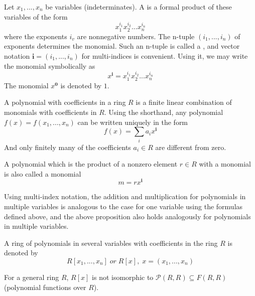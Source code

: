 \documentclass[12pt, a4paper, oneside, openright, titlepage]{book}
\begin{document}
\begin{defn}
    Let $x_1,...,x_n$ be variables (indeterminates). A  is a formal product of these variables of the form \begin{equation}
            x_1^{i_1}x_2^{i_2}...x_n^{i_n}
    \end{equation}
    where the exponents $i_v$ are nonnegative numbers. The n-tuple $(i_1,...,i_n)$ of exponents determines the monomial. Such an n-tuple is called a , and vector notation $\mathbf{i} = (i_1,...,i_n)$ for multi-indices is convenient. Using it, we may write the monomial symbolically as \begin{equation}
            x^{\mathbf{i}}=x_1^{i_1}x_2^{i_2}...x_n^{i_n}
    \end{equation}
    The monomial $x^{\mathbf{0}}$ is denoted by $1$.


    A polynomial with coefficients in a ring $R$ is a finite linear combination of monomials with coefficients in $R$. Using the shorthand, any polynomial $f(x) = f(x_1,...,x_n)$ can be written uniquely in the form \begin{equation}
            f(x) = \sum\limits_{i} a_{i}x^{\mathbf{i}}
    \end{equation}
    And only finitely many of the coefficients $a_i \in R$ are different from zero.


    A polynomial which is the product of a nonzero element $r \in R$ with a monomial is also called a monomial \begin{equation}
            m=rx^{\mathbf{i}}
    \end{equation}


    Using multi-index notation, the addition and multiplication for polynomials in multiple variables is analogous to the case for one variable using the formulas defined above, and the above proposition also holds analogously for polynomials in multiple variables. 

    A ring of polynomials in several variables with coefficients in the ring $R$ is denoted by \begin{equation}
         R[x_1,...,x_n]\;or\;R[x],\;x=(x_1,...,x_n)
    \end{equation}
\end{defn}


\begin{rmk}
    For a general ring $R$, $R[x]$ is not isomorphic to $\mathcal{P}(R,R) \subseteq F(R,R)$ (polynomial functions over $R$).
\end{rmk}
\end{document}

